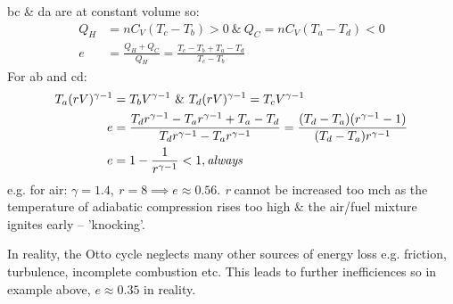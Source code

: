 \documentclass[a4paper, 11pt, normalem]{report}
\begin{document}
bc \& da are at constant volume so:
\begin{align}
    Q_{H} &= nC_{V}(T_{c} - T_{b}) > 0 ~\&~ Q_{C} = nC_{V}(T_{a} - T_{d}) < 0 \\
    e &= \frac{Q_{H} + Q_{C}}{Q_{H}} = \frac{T_{c} - T_{b} + T_{a} - T_{d}}{T_{c} - T_{b}}
\end{align}
For ab and cd:
\begin{align}
    T_{a}(rV)^{\gamma - 1} &= T_{b}V^{\gamma - 1} ~\&~ T_{d}(rV)^{\gamma - 1} = T_{c}V^{\gamma - 1} \\
    e &= \frac{T_{d}r^{\gamma - 1} - T_{a}r^{\gamma - 1} + T_{a} - T_{d}}{T_{d}r^{\gamma - 1} - T_{a}r^{\gamma - 1}} = \frac{(T_{d} - T_{a})(r^{\gamma - 1} - 1)}{(T_{d} - T_{a})r^{\gamma - 1}} \\
    e &= 1 - \frac{1}{r^{\gamma - 1}} < 1, \emph{\text{always}}
\end{align}
e.g. for air: $\gamma = 1.4, ~ r = 8 \implies e \approx 0.56$.
\emph{r} cannot be increased too mch as the temperature of adiabatic compression rises too high \& the air/fuel mixture ignites early -- 'knocking'.

In reality, the Otto cycle neglects many other sources of energy loss e.g. friction, turbulence, incomplete combustion etc. 
This leads to further inefficiences so in example above, $e \approx 0.35$ in reality.
\end{document}
